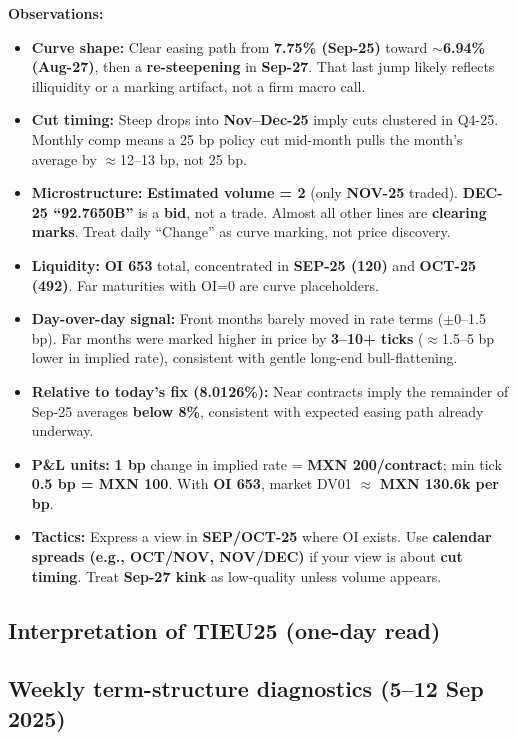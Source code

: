 \documentclass[10pt,a4paper]{article} %
\begin{document}
\textbf{Observations:}
\begin{itemize}
  \item \textbf{Curve shape:} Clear easing path from \textbf{7.75\% (Sep-25)} toward \textbf{$\sim$6.94\% (Aug-27)}, then a \textbf{re-steepening} in \textbf{Sep-27}. That last jump likely reflects illiquidity or a marking artifact, not a firm macro call.
  \item \textbf{Cut timing:} Steep drops into \textbf{Nov--Dec-25} imply cuts clustered in Q4-25. Monthly comp means a 25 bp policy cut mid-month pulls the month’s average by $\approx$12--13 bp, not 25 bp.
  \item \textbf{Microstructure:} \textbf{Estimated volume = 2} (only \textbf{NOV-25} traded). \textbf{DEC-25 ``92.7650B''} is a \textbf{bid}, not a trade. Almost all other lines are \textbf{clearing marks}. Treat daily ``Change'' as curve marking, not price discovery.
  \item \textbf{Liquidity:} \textbf{OI 653} total, concentrated in \textbf{SEP-25 (120)} and \textbf{OCT-25 (492)}. Far maturities with OI=0 are curve placeholders.
  \item \textbf{Day-over-day signal:} Front months barely moved in rate terms ($\pm$0--1.5 bp). Far months were marked higher in price by \textbf{3--10+ ticks} ($\approx$1.5--5 bp lower in implied rate), consistent with gentle long-end bull-flattening.
  \item \textbf{Relative to today’s fix (8.0126\%):} Near contracts imply the remainder of Sep-25 averages \textbf{below 8\%}, consistent with expected easing path already underway.
  \item \textbf{P\&L units:} \textbf{1 bp} change in implied rate = \textbf{MXN 200/contract}; min tick \textbf{0.5 bp = MXN 100}. With \textbf{OI 653}, market DV01 $\approx$ \textbf{MXN 130.6k per bp}.
  \item \textbf{Tactics:} Express a view in \textbf{SEP/OCT-25} where OI exists. Use \textbf{calendar spreads (e.g., OCT/NOV, NOV/DEC)} if your view is about \textbf{cut timing}. Treat \textbf{Sep-27 kink} as low-quality unless volume appears.
\end{itemize}


\subsection{Interpretation of \texorpdfstring{TIEU25}{TIEU25} (one-day read)}
\subsection{Weekly term-structure diagnostics (5–12 Sep 2025)}
\end{document}
